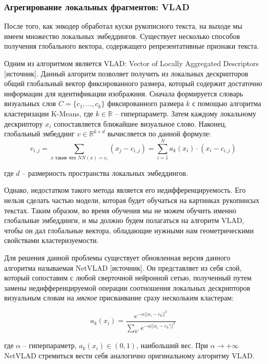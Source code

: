 \subsubsection{Агрегирование локальных фрагментов: VLAD}

    После того, как энкодер обработал куски рукописного текста, на выходе мы имеем множество локальных эмбеддингов. Существует несколько способов получения глобального вектора, содержащего репрезентативные признаки текста. 

    Одним из алгоритмом является VLAD: Vector of Locally Aggregated Descriptors [источник]. Данный алгоритм позволяет получить из локальных дескрипторов общий глобальный вектор фиксированного размера, который содержит достаточно информации для идентификации изображния. Сначала формируется словарь визуальных слов $C = \{ c_1, \dots, c_k \}$ фиксированного размера $k$ с помощью алгоритма кластеризации K-Means, где $k \in \mathbb{R}$ -- гиперпараметр. Затем каждому локальному дескриптору $x_i$ сопоставляется ближайшее визуальное слово. Наконец, глобальный эмбеддинг $v \in \mathbb{R}^{k \times d}$ вычисляется по данной формуле:
    $$
        v_{i, j} = \sum_{x \text{ такие что } NN(x) = c_i} (x_j - c_{i, j}) = \sum_{i = 1}^N a_k(x_i) \cdot (x_i - c_{i, j})
    $$

    \noindent
    где $d$ -- размерность пространства локальных эмбеддингов.

    Однако, недостатком такого метода является его недифференцируемость. Его нельзя сделать частью модели, которая будет обучаться на картинках рукопинсых текстах. Таким образом, во время обучения мы не можем обучить именно глобальные эмбеддинги, и мы должно будем полагаться на алгоритм VLAD, чтобы он дал глобальные вектора, обладающие нужными нам геометрическими свойствами кластеризуемости.
    
    Для решения данной проблемы существует обновленная версия данного алгоритма называемая NetVLAD [источник]. Он представляет из себя слой, который сопоставим с любой сверточной нейронной сетью, полученный путем замены недифференцируемой операции соотношения локальных дескрипторов визуальным словам на \textit{мягкое} присваивание сразу нескольким кластерам:
    
    $$
        a_k(x_i) = \frac{e^{- \alpha || x_i - c_k ||^2}}{\sum_{k'} e^{- \alpha || x_i - c_k' ||^2}}
    $$

    \noindent
    где $\alpha$ -- гиперпараметр, $a_k(x_i) \in (0, 1)$, наибольший вес. При $\alpha \rightarrow + \infty$ NetVLAD стремиться вести себя аналогично оригинальному алгоритму VLAD.

